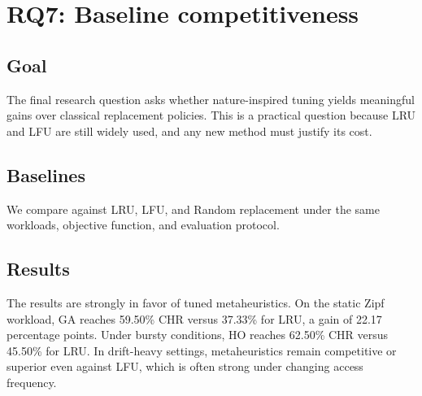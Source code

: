 \documentclass[10pt,journal,compsoc]{IEEEtran}
\begin{document}
\section{RQ7: Baseline competitiveness}
\subsection{Goal}
The final research question asks whether nature-inspired tuning yields meaningful gains over classical replacement policies. This is a practical question because LRU and LFU are still widely used, and any new method must justify its cost.

\subsection{Baselines}
We compare against LRU, LFU, and Random replacement under the same workloads, objective function, and evaluation protocol.

\subsection{Results}
The results are strongly in favor of tuned metaheuristics. On the static Zipf workload, GA reaches 59.50\% CHR versus 37.33\% for LRU, a gain of 22.17 percentage points. Under bursty conditions, HO reaches 62.50\% CHR versus 45.50\% for LRU. In drift-heavy settings, metaheuristics remain competitive or superior even against LFU, which is often strong under changing access frequency.
\end{document}
